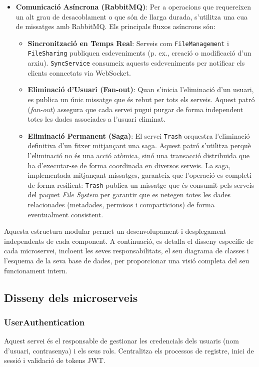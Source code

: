 \begin{itemize}
    \item \textbf{Comunicació Asíncrona (RabbitMQ)}: Per a operacions que requereixen un alt grau de desacoblament o que són de llarga durada, s'utilitza una cua de missatges amb RabbitMQ. Els principals fluxos asíncrons són:
    \begin{itemize}
        \item \textbf{Sincronització en Temps Real}: Serveis com \texttt{FileManagement} i \texttt{FileSharing} publiquen esdeveniments (p. ex., creació o modificació d'un arxiu). \texttt{SyncService} consumeix aquests esdeveniments per notificar els clients connectats via WebSocket.
        \item \textbf{Eliminació d'Usuari (Fan-out)}: Quan s'inicia l'eliminació d'un usuari, es publica un únic missatge que és rebut per tots els serveis. Aquest patró (\textit{fan-out}) assegura que cada servei pugui purgar de forma independent totes les dades associades a l'usuari eliminat.
        \item \textbf{Eliminació Permanent (Saga)}: El servei \texttt{Trash} orquestra l'eliminació definitiva d'un fitxer mitjançant una saga. Aquest patró s'utilitza perquè l'eliminació no és una acció atòmica, sinó una transacció distribuïda que ha d'executar-se de forma coordinada en diversos serveis. La saga, implementada mitjançant missatges, garanteix que l'operació es completi de forma resilient: \texttt{Trash} publica un missatge que és consumit pels serveis del paquet \textit{File System} per garantir que es netegen totes les dades relacionades (metadades, permisos i comparticions) de forma eventualment consistent.
    \end{itemize}
\end{itemize}

Aquesta estructura modular permet un desenvolupament i desplegament independents de cada component. A continuació, es detalla el disseny específic de cada microservei, incloent les seves responsabilitats, el seu diagrama de classes i l'esquema de la seva base de dades, per proporcionar una visió completa del seu funcionament intern.

\subsection{Disseny dels microserveis}

\subsubsection{UserAuthentication}
Aquest servei és el responsable de gestionar les credencials dels usuaris (nom d'usuari, contrasenya) i els seus rols. Centralitza els processos de registre, inici de sessió i validació de tokens JWT.

